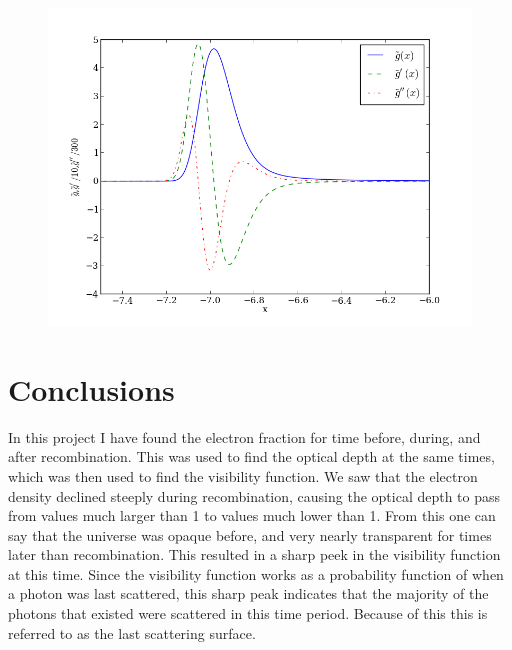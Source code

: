 \documentclass{aa}   %
\begin{document}
 
   \begin{figure}[ht]
   \includegraphics[width=.49\textwidth]{g.png}
   \caption{}
  \label{figure2}
  \end{figure}
%  
% 

\section{Conclusions} \label{sec:conclusions}
In this project I have found the electron fraction for time before, during, and after recombination.
This was used to find the optical depth at the same times, which was then used to find the visibility function.
We saw that the electron density declined steeply during recombination, causing the optical depth to pass from values much larger than 1 to values much lower than 1. 
From this one can say that the universe was opaque before, and very nearly transparent for times later than recombination.
This resulted in a sharp peek in the visibility function at this time. Since the visibility function works as a probability function of when a photon was last scattered, this sharp peak indicates that the majority of the photons that existed were scattered in this time period. Because of this this is referred to as the last scattering surface. 
\end{document}
